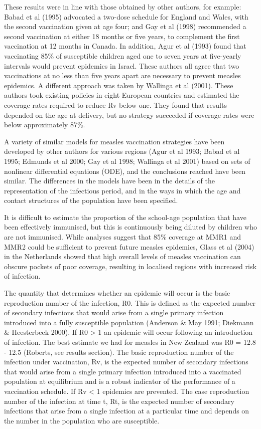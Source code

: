 \documentclass{article}
\begin{document}
These results were in line with those obtained by other authors, for example: Babad et al (1995) advocated a two-dose schedule for England and Wales, with the second vaccination given at age four; and Gay et al (1998) recommended a second vaccination at either 18 months or five years, to complement the first vaccination at 12 months in Canada. In addition, Agur et al (1993) found that vaccinating 85\% of susceptible children aged one to seven years at five-yearly intervals would prevent epidemics in Israel. These authors all agree that two
vaccinations at no less than five years apart are necessary to prevent measles epidemics.
A different approach was taken by Wallinga et al (2001). These authors took existing policies in eight European countries and estimated the coverage rates required to reduce Rv below one. They found that results depended on the age at delivery, but no strategy succeeded if coverage rates were below approximately
87\%.

A variety of similar models for measles vaccination strategies have been developed by other authors for various regions (Agur et al 1993; Babad et al 1995; Edmunds et al 2000; Gay et al 1998; Wallinga et al 2001) based on sets of nonlinear differential equations (ODE), and the conclusions reached have been similar. The differences in the models have been in the details of the representation of the infectious period, and in the ways in which the age and contact structures of the population have been specified.

It is difficult to estimate the proportion of the school-age population that have been effectively immunised, but this is continuously being diluted by children who are not immunised. While analyses suggest that 85\% coverage at MMR1 and MMR2 could be sufficient to prevent future measles epidemics, Glass et al (2004) in the Netherlands showed that high overall levels of measles vaccination can obscure pockets of poor coverage, resulting in localised regions with increased risk of infection.

The quantity that determines whether an epidemic will occur is the basic reproduction number of the infection, R0. This is defined as the expected number of secondary infections that would arise from a single primary infection introduced into a fully susceptible population (Anderson & May 1991; Diekmann & Heesterbeek 2000). If R0 > 1 an epidemic will occur following an introduction of infection. The best estimate we had for measles in New Zealand was R0 = 12.8 - 12.5 (Roberts, see results section). The basic reproduction number of the infection under vaccination, Rv, is the expected number of secondary infections that would arise from a single primary infection introduced into a vaccinated population at equilibrium and is a robust indicator of the performance of a vaccination schedule. If Rv < 1 epidemics are prevented. The case reproduction number of the infection at time t, Rt, is the expected number of secondary infections that arise from a single infection at a particular time and depends on the number in the population who are susceptible.
\end{document}
